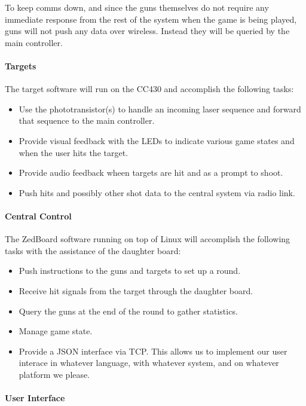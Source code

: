 \documentclass{article}
\begin{document}
To keep comms down, and since the guns themselves do not require any immediate response from the rest of the system
when the game is being played, guns will not push any data over wireless.
Instead they will be queried by the main controller.

\paragraph{Targets}

The target software will run on the CC430 and accomplish the following tasks:
\begin{itemize}
\item Use the phototransistor(s) to handle an incoming laser sequence and forward that sequence to the main controller.
\item Provide visual feedback with the LEDs to indicate various game states and when the user hits the target.
\item Provide audio feedback wheen targets are hit and as a prompt to shoot.
\item Push hits and possibly other shot data to the central system via radio link.
\end{itemize}

\paragraph{Central Control}

The ZedBoard software running on top of Linux will accomplish the following tasks
with the assistance of the daughter board:
\begin{itemize}
\item Push instructions to the guns and targets to set up a round.
\item Receive hit signals from the target through the daughter board.
\item Query the guns at the end of the round to gather statistics.
\item Manage game state.
\item Provide a JSON interface via TCP.
	This allows us to implement our user interace in whatever language, with whatever system, and on whatever platform
	we please.
\end{itemize}

\paragraph{User Interface}
\end{document}
